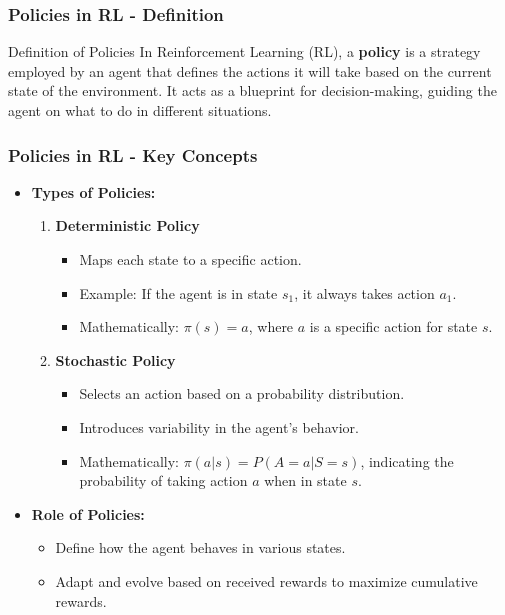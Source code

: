 \documentclass{beamer}
\begin{document}
\begin{frame}[fragile]
    \frametitle{Policies in RL - Definition}
    \begin{block}{Definition of Policies}
        In Reinforcement Learning (RL), a \textbf{policy} is a strategy employed by an agent that defines the actions it will take based on the current state of the environment. 
        It acts as a blueprint for decision-making, guiding the agent on what to do in different situations.
    \end{block}
\end{frame}

\begin{frame}[fragile]
    \frametitle{Policies in RL - Key Concepts}
    \begin{itemize}
        \item \textbf{Types of Policies:}
        \begin{enumerate}
            \item \textbf{Deterministic Policy}
            \begin{itemize}
                \item Maps each state to a specific action.
                \item Example: If the agent is in state $s_1$, it always takes action $a_1$.
                \item Mathematically: $\pi(s) = a$, where $a$ is a specific action for state $s$.
            \end{itemize}
            \item \textbf{Stochastic Policy}
            \begin{itemize}
                \item Selects an action based on a probability distribution.
                \item Introduces variability in the agent's behavior.
                \item Mathematically: $\pi(a|s) = P(A=a | S=s)$, indicating the probability of taking action $a$ when in state $s$.
            \end{itemize}
        \end{enumerate}
        
        \item \textbf{Role of Policies:}
        \begin{itemize}
            \item Define how the agent behaves in various states.
            \item Adapt and evolve based on received rewards to maximize cumulative rewards.
        \end{itemize}
    \end{itemize}
\end{frame}
\end{document}
